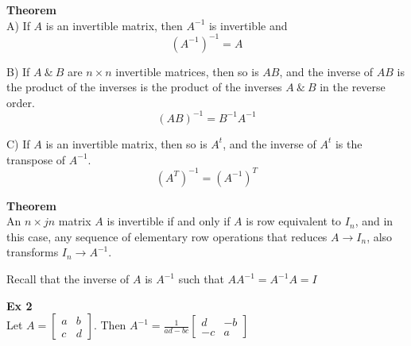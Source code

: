 \documentclass{article}
\begin{document}
  \textbf{Theorem}\\
  A) If $ A $ is an invertible matrix, then $ A^{-1}$ is invertible and
  \[
    (A^{-1})^{-1}=A 
  \]

  B) If $ A ~\&~ B $ are $ n \times n $ invertible matrices, then so is $ AB $, and the inverse of $ AB $ is the product of the inverses is the product of the inverses $ A ~\&~ B $ in the reverse order.
  \[
    (AB)^{-1}=B^{-1}A^{-1}   
  \]
  
  C) If $ A $  is an invertible matrix, then so is $ A^{t}  $, and the inverse of $ A^{t}  $ is the transpose of $ A^{-1}  $.
  \[
    (A^{T} )^{-1}=(A^{-1})^{T} 
  \]

  \textbf{Theorem}\\
  An $ n \times jn $ matrix $ A $ is invertible if and only if $ A $ is row equivalent to $ I_{n}  $, and in this case, any sequence of elementary row operations that reduces $ A \to I_{n} $, also transforms $ I_{n}\to A^{-1}   $. 
  
  
  
  
  
  

  Recall that the inverse of $ A $ is $ A^{-1}  $  such that $ AA^{-1}=A^{-1}A=I   $

  \textbf{Ex 2}\\
  Let $ A = \begin{bmatrix}
      a &b\\
      c &d
  \end{bmatrix} $. Then $ A^{-1} = \frac{1}{ad-bc}  \begin{bmatrix}
      d &-b\\
      -c &a
  \end{bmatrix} $ 
  
\end{document}
